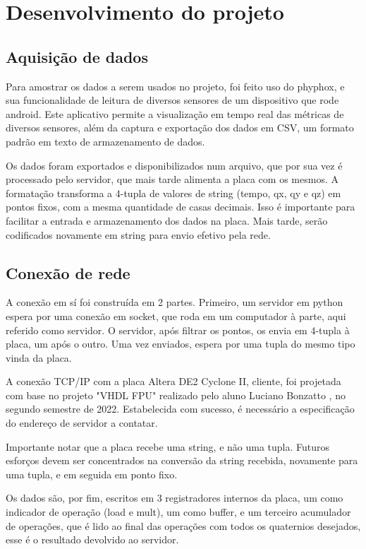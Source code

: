 \documentclass [12pt,oneside] {article}
\begin{document}
\section{Desenvolvimento do projeto}

\subsection{Aquisição de dados}

	Para amostrar os dados a serem usados no projeto, foi feito
uso do phyphox, e sua funcionalidade de leitura de diversos
sensores de um dispositivo que rode android. Este aplicativo permite a
visualização em tempo real das métricas de diversos sensores, além da
captura e exportação dos dados em CSV, um formato padrão em texto de
armazenamento de dados.

	Os dados foram exportados e disponibilizados num arquivo, que
por sua vez é processado pelo servidor, que mais tarde alimenta a
placa com os mesmos. A formatação transforma a 4-tupla de valores de
string (tempo, qx, qy e qz) em pontos fixos, com a mesma
quantidade de casas decimais. Isso é importante para facilitar a
entrada e armazenamento dos dados na placa. Mais tarde, serão
codificados novamente em string para envio efetivo pela rede.

\subsection{Conexão de rede}

	A conexão em sí foi construída em 2 partes. Primeiro, um
servidor em python espera por uma conexão em socket, que roda em um
computador à parte, aqui referido como servidor. O servidor, após filtrar
os pontos, os envia em 4-tupla à placa, um após o outro. Uma vez
enviados, espera por uma tupla do mesmo tipo vinda da placa.

	A conexão TCP/IP com a placa Altera DE2 Cyclone II, cliente,
foi projetada com base no projeto "VHDL FPU" realizado pelo aluno
Luciano Bonzatto , no segundo semestre de 2022. Estabelecida com
sucesso, é necessário a especificação do endereço de servidor a
contatar.

	Importante notar que a placa recebe uma string, e não uma
tupla. Futuros esforços devem ser concentrados na conversão da string
recebida, novamente para uma tupla, e em seguida em ponto fixo.

	Os dados são, por fim, escritos em 3 registradores internos da
placa, um como indicador de operação (load e mult), um como buffer, e
um terceiro acumulador de operações, que é lido ao final das operações
com todos os quaternios desejados, esse é o resultado devolvido ao servidor.
\end{document}

